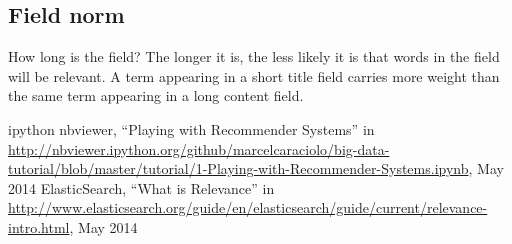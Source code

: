 \documentclass[a4 paper,11pt]{report}
\begin{document}
\subsection {Field norm}
How long is the field? The longer it is, the less likely it is that words in the field will be relevant. A term appearing in a short title field carries more weight than the same term appearing in a long content field.

\begin{thebibliography}{10}
 ipython nbviewer, ``Playing with Recommender Systems'' in \url{http://nbviewer.ipython.org/github/marcelcaraciolo/big-data-tutorial/blob/master/tutorial/1-Playing-with-Recommender-Systems.ipynb}, May 2014
 ElasticSearch, ``What is Relevance'' in \url{http://www.elasticsearch.org/guide/en/elasticsearch/guide/current/relevance-intro.html}, May 2014
\end{thebibliography}
\end{document}
